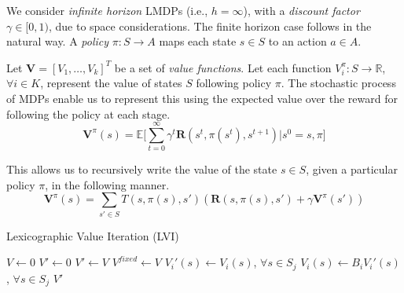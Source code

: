 We consider \emph{infinite horizon} LMDPs (i.e., $h = \infty$), with a \emph{discount factor} $\gamma \in [0, 1)$, due to space considerations. The finite horizon case follows in the natural way. A \emph{policy} $\pi : S \rightarrow A$ maps each state $s \in S$ to an action $a \in A$.


Let $\mathbf{V} = [V_1, \ldots, V_k]^T$ be a set of \emph{value functions}. Let each function $V_i^\pi : S \rightarrow \mathbb{R}$, $\forall i \in K$, represent the value of states $S$ following policy $\pi$. The stochastic process of MDPs enable us to represent this using the expected value over the reward for following the policy at each stage.
\begin{equation*}
    \mathbf{V}^\pi(s) = \mathbb{E} \Big[ \sum_{t=0}^\infty \gamma^t \mathbf{R}(s^t, \pi(s^t), s^{t+1}) \Big| s^0 = s, \pi \Big]
\end{equation*}

This allows us to recursively write the value of the state $s \in S$, given a particular policy $\pi$, in the following manner.
\begin{equation*}
    \mathbf{V}^\pi(s) = \sum_{s' \in S} T(s, \pi(s), s') (\mathbf{R}(s, \pi(s), s') + \gamma \mathbf{V}^\pi(s'))
\end{equation*}


\begin{algorithm}[t]
    \begin{algorithmic}[1]
        \caption{Lexicographic Value Iteration (LVI)}
        \label{alg:lvi}
        \STATE $V \leftarrow 0$
        \STATE $V' \leftarrow 0$
            \STATE $V' \leftarrow V$
            \STATE $V^{fixed} \leftarrow V$
                        \STATE $V_i'(s) \leftarrow V_i(s)$, $\forall s \in S_j$
                        \STATE $V_i(s) \leftarrow B_i V_i'(s)$, $\forall s \in S_j$
                    \ENDWHILE
                \ENDFOR
            \ENDFOR
        \ENDWHILE
        \RETURN $V'$
    \end{algorithmic}
\end{algorithm}


